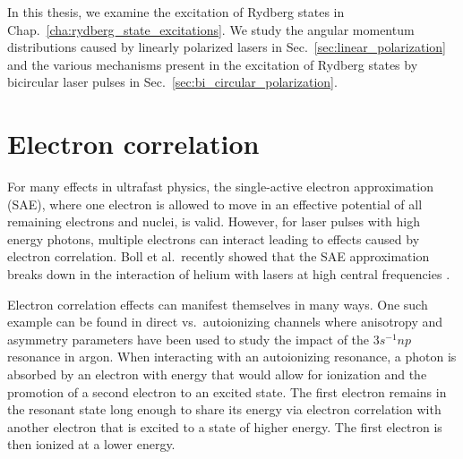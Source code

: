 In this thesis, we examine the excitation of Rydberg states in Chap.~\ref{cha:rydberg_state_excitations}. We study the angular momentum distributions caused by linearly polarized lasers in Sec.~\ref{sec:linear_polarization} and the various mechanisms present in the excitation of Rydberg states by bicircular laser pulses in Sec.~\ref{sec:bi_circular_polarization}.

\section{Electron correlation} %
\label{sec:electron_correlation}

For many effects in ultrafast physics, the single-active electron approximation (SAE), where one electron is allowed to move in an effective potential of all remaining electrons and nuclei, is valid. However, for laser pulses with high energy photons, multiple electrons can interact leading to effects caused by electron correlation. Boll et al.\ recently showed that the SAE approximation breaks down in the interaction of helium with lasers at high central frequencies \cite{boll2019}.

Electron correlation effects can manifest themselves in many ways. One such example can be found in direct vs.\ autoionizing channels \cite{cirelli2018} where anisotropy and asymmetry parameters have been used to study the impact of the $3s^{-1}np$ resonance in argon. When interacting with an autoionizing resonance, a photon is absorbed by an electron with energy that would allow for ionization and the promotion of a second electron to an excited state. The first electron remains in the resonant state long enough to share its energy via electron correlation with another electron that is excited to a state of higher energy. The first electron is then ionized at a lower energy. 

